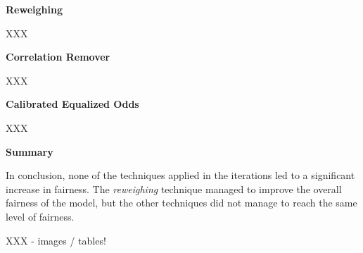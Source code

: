 \textbf{Reweighing}

XXX

\textbf{Correlation Remover}

XXX

\textbf{Calibrated Equalized Odds}

XXX

\textbf{Summary}

In conclusion, none of the techniques applied in the iterations led to a significant increase in fairness. The \textit{reweighing} technique managed to improve the overall fairness of the model, but the other techniques did not manage to reach the same level of fairness. 

XXX - images / tables!